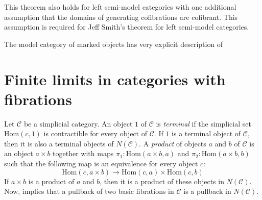 \documentclass[reqno]{amsart}
\theoremstyle{definition}
\theoremstyle{remark}
\newcommand{\fs}[1]{\mathrm{#1}}
\newcommand{\Hom}{\fs{Hom}}
\newcommand{\cat}[1]{\mathcal{#1}}
\newcommand{\C}{\cat{C}}
\numberwithin{figure}{section}
\begin{document}
\begin{remark}
This theorem also holds for left semi-model categories with one additional assumption that the domains of generating cofibrations are cofibrant.
This assumption is required for Jeff Smith's theorem for left semi-model categories.
\end{remark}

The model category of marked objects has very explicit description of 

\section{Finite limits in categories with fibrations}

Let $\C$ be a simplicial category.
An object $1$ of $\C$ is \emph{terminal} if the simplicial set $\Hom(c,1)$ is contractible for every object of $\C$.
If $1$ is a terminal object of $\C$, then it is also a terminal objects of $N(\C)$.
A \emph{product} of objects $a$ and $b$ of $\C$ is an object $a \times b$ together with maps $\pi_1 : \Hom(a \times b, a)$ and $\pi_2 : \Hom(a \times b, b)$ such that the following map is an equivalence for every object $c$:
\[ \Hom(c, a \times b) \to \Hom(c,a) \times \Hom(c,b) \]
If $a \times b$ is a product of $a$ and $b$, then it is a product of these objects in $N(\C)$.
Now,  implies that a pullback of two basic fibrations in $\C$ is a pullback in $N(\C)$.



\end{document}
